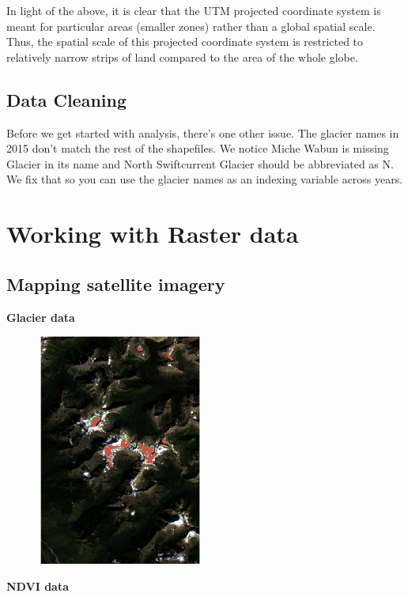 \documentclass[11pt]{article}
\begin{document}
In light of the above, it is clear that the UTM projected coordinate system is meant for particular
areas (smaller zones) rather than a global spatial scale. Thus, the spatial scale of this projected
coordinate system is restricted to relatively narrow strips of land compared to the area of the
whole globe.\\

\subsection*{Data Cleaning}

Before we get started with analysis, there’s one other issue. The glacier names in 2015 don’t match the rest of the shapefiles. We notice Miche Wabun is missing Glacier in its name and North Swiftcurrent Glacier should be abbreviated as N. We fix that so you can use the glacier names as an indexing variable across years.\\

\section*{Working with Raster data}

\subsection*{Mapping satellite imagery}

\textbf{Glacier data}

\begin{center}
\includegraphics[width=3in, height=3in]{glacier_data.png}
\end{center}

\textbf{NDVI data}
\end{document}
